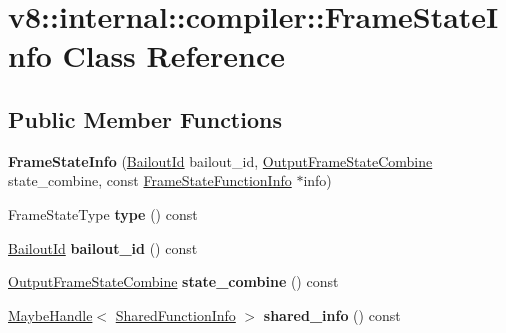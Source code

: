 \hypertarget{classv8_1_1internal_1_1compiler_1_1_frame_state_info}{}\section{v8\+:\+:internal\+:\+:compiler\+:\+:Frame\+State\+Info Class Reference}
\label{classv8_1_1internal_1_1compiler_1_1_frame_state_info}
\subsection*{Public Member Functions}
\begin{DoxyCompactItemize}
\item 
{\bfseries Frame\+State\+Info} (\hyperlink{classv8_1_1internal_1_1_bailout_id}{Bailout\+Id} bailout\+\_\+id, \hyperlink{classv8_1_1internal_1_1compiler_1_1_output_frame_state_combine}{Output\+Frame\+State\+Combine} state\+\_\+combine, const \hyperlink{classv8_1_1internal_1_1compiler_1_1_frame_state_function_info}{Frame\+State\+Function\+Info} $\ast$info)\hypertarget{classv8_1_1internal_1_1compiler_1_1_frame_state_info_af54c6c4cf164f0a1ddf5cda510f491cc}{}\label{classv8_1_1internal_1_1compiler_1_1_frame_state_info_af54c6c4cf164f0a1ddf5cda510f491cc}

\item 
Frame\+State\+Type {\bfseries type} () const \hypertarget{classv8_1_1internal_1_1compiler_1_1_frame_state_info_a99e2d14bb955eb61735f8aa402ca3c20}{}\label{classv8_1_1internal_1_1compiler_1_1_frame_state_info_a99e2d14bb955eb61735f8aa402ca3c20}

\item 
\hyperlink{classv8_1_1internal_1_1_bailout_id}{Bailout\+Id} {\bfseries bailout\+\_\+id} () const \hypertarget{classv8_1_1internal_1_1compiler_1_1_frame_state_info_a7ed129f1b9149295049dfff78e65e4d2}{}\label{classv8_1_1internal_1_1compiler_1_1_frame_state_info_a7ed129f1b9149295049dfff78e65e4d2}

\item 
\hyperlink{classv8_1_1internal_1_1compiler_1_1_output_frame_state_combine}{Output\+Frame\+State\+Combine} {\bfseries state\+\_\+combine} () const \hypertarget{classv8_1_1internal_1_1compiler_1_1_frame_state_info_af04dd39e72f2b43ba32459f5ff6581a4}{}\label{classv8_1_1internal_1_1compiler_1_1_frame_state_info_af04dd39e72f2b43ba32459f5ff6581a4}

\item 
\hyperlink{classv8_1_1internal_1_1_maybe_handle}{Maybe\+Handle}$<$ \hyperlink{classv8_1_1internal_1_1_shared_function_info}{Shared\+Function\+Info} $>$ {\bfseries shared\+\_\+info} () const \hypertarget{classv8_1_1internal_1_1compiler_1_1_frame_state_info_a00f889ad5cbeba355e0e44da7bc6e447}{}\label{classv8_1_1internal_1_1compiler_1_1_frame_state_info_a00f889ad5cbeba355e0e44da7bc6e447}


\end{DoxyCompactItemize}
